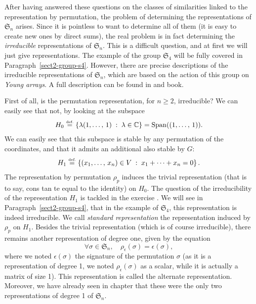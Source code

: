  
 
After having answered these questions on the classes of similarities linked to the representation by permutation, the problem of determining the representations of $ \mathfrak{S}_n $ arises. Since it is pointless to want to determine all of them (it is easy to create new ones by direct sums), the real problem is in fact determining the \textit{irreducible} representations of $ \mathfrak{S}_n $. This is a difficult question, and at first we will just give  representations. The example of the group $ \mathfrak{S}_4 $ will be fully covered in Paragraph~\ref{sect2-group-s4}. However, there are precise descriptions of the irreducible representations of $ \mathfrak{S}_n $, which are based on the action of this group on \textit{Young arrays}. A full description can be found in  and  \cite{fulton} book.
 
 
First of all, is the permutation representation, for $ n \geq 2 $, irreducible? We can easily see that not, by looking at the subspace
\begin{equation}
\label{eq-defn-repr-std1}
H_0 \stackrel{\mbox{\upshape\tiny def.}}{=} \left\{ \lambda (1, \ldots, \, 1) \;:\; \lambda \in \mathbb{C} \right\} = \operatorname{Span} ((1, \ldots, \, 1)).
\end{equation}
We can easily see that this subspace is stable by any permutation of the coordinates, and that it admits an additional also stable by $G$:
\begin{equation}
\label{eq-defn-repr-std2}
H_1 \stackrel{\mbox{\upshape\tiny def.}}{=} \left\{ (x_1, \ldots, \, x_n) \in V \;:\; x_1 + \cdots + x_n = 0 \right\}.
\end{equation}
 The representation by permutation $ \rho_p $ induces the trivial representation (that is to say, cons \-tan \-te equal to the identity) on $ H_0 $. The question of the irreducibility of the representation $ H_1 $ is tackled in the exercise . We will see in Paragraph~\ref{sect2-group-s4}, that in the example of $ \mathfrak{S}_4 $, this representation is indeed irreducible. We call \textit{standard representation} the representation induced by $ \rho_p $ on $ H_1 $. Besides the trivial representation (which is of course irreducible), there remains another representation of degree one, given by the equation
\begin{equation*}
\forall \sigma \in \mathfrak{S}_n, \quad \rho_{\epsilon} (\sigma) = \epsilon (\sigma),
\end{equation*}
 where we noted $ \epsilon (\sigma) $ the signature of the permutation $ \sigma $ (as it is a representation of degree 1, we noted $ \rho_{ \epsilon} (\sigma) $ as a scalar, while it is actually a matrix of size 1). This representation is called the alternate representation. Moreover, we have already seen in chapter  that these were the only two representations of degree 1 of $\mathfrak{S}_n$.

